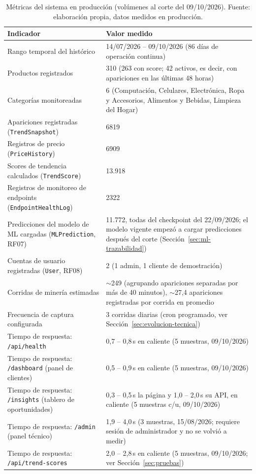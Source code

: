 \begin{table}[H]
	\centering
	\small
	\caption{Métricas del sistema en producción (volúmenes al corte del 09/10/2026). Fuente: elaboración propia, datos medidos en producción.}
	\label{tab:evidencia}
	\begin{tabularx}{\textwidth}{@{}>{\raggedright\arraybackslash}p{5.2cm} X@{}}
		\toprule
		\textbf{Indicador} & \textbf{Valor medido} \\
		\midrule
		Rango temporal del histórico & 14/07/2026 -- 09/10/2026 (86 días de operación continua) \\
		Productos registrados & 310 (263 con score; 42 activos, es decir, con apariciones en las últimas 48 horas) \\
		Categorías monitoreadas & 6 (Computación, Celulares, Electrónica, Ropa y Accesorios, Alimentos y Bebidas, Limpieza del Hogar) \\
		Apariciones registradas (\texttt{TrendSnapshot}) & 6819 \\
		Registros de precio (\texttt{PriceHistory}) & 6909 \\
		Scores de tendencia calculados (\texttt{TrendScore}) & 13.918 \\
		Registros de monitoreo de endpoints (\texttt{EndpointHealthLog}) & 2322 \\
		Predicciones del modelo de ML cargadas (\texttt{MLPrediction}, RF07) & 11.772, todas del checkpoint del 22/09/2026; el modelo vigente empezó a cargar predicciones después del corte (Sección~\ref{sec:ml-trazabilidad}) \\
		Cuentas de usuario registradas (\texttt{User}, RF08) & 2 (1 admin, 1 cliente de demostración) \\
		Corridas de minería estimadas & $\sim$249 (agrupando apariciones separadas por más de 40 minutos), $\sim$27,4 apariciones registradas por corrida en promedio \\
		Frecuencia de captura configurada & 3 corridas diarias (cron programado, ver Sección~\ref{sec:evolucion-tecnica}) \\
		Tiempo de respuesta: \texttt{/api/health} & 0,7 -- 0,8\,s en caliente (5 muestras, 09/10/2026) \\
		Tiempo de respuesta: \texttt{/dashboard} (panel de clientes) & 0,5 -- 0,9\,s en caliente (5 muestras, 09/10/2026) \\
		Tiempo de respuesta: \texttt{/insights} (tablero de oportunidades) & 0,3 -- 0,5\,s la página y 1,0 -- 2,0\,s su API, en caliente (5 muestras c/u, 09/10/2026) \\
		Tiempo de respuesta: \texttt{/admin} (panel técnico) & 1,9 -- 4,0\,s (3 muestras, 15/08/2026; requiere sesión de administrador y no se volvió a medir) \\
		Tiempo de respuesta: \texttt{/api/trend-scores} & 2,0 -- 2,8\,s en caliente (5 muestras, 09/10/2026; ver Sección~\ref{sec:pruebas}) \\
		\bottomrule
	\end{tabularx}
\end{table}

